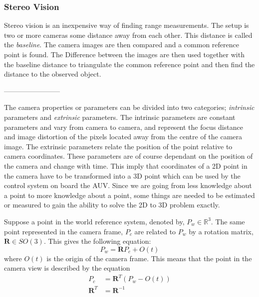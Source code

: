 \subsubsection{Stereo Vision}
Stereo vision is an inexpensive way of finding range measurements. The setup is two or
more cameras some distance away from each other. This distance is called the
\emph{baseline}. The camera images are then compared and a common reference point is
found. The Difference between the images are then used together with the baseline distance
to triangulate the common reference point and then find the distance to the observed
object. 


------------------------

	The camera properties or parameters can be divided into two categories; \textit{intrinsic} parameters and
	\textit{extrinsic} parameters. The intrinsic parameters are constant parameters and vary from camera to
	camera, and represent the focus distance and image distortion of the pixels located away from the centre of the
	camera image. 
	The extrinsic parameters relate the position of the point relative to camera coordinates. 
	These parameters are of course dependant on the position of the camera and change with time. 	This imply that 
	coordinates of a 2D point in the camera have to be transformed into a 3D point which can be used 
	by the control system on board the AUV. Since 
	we are going from less knowledge about a point to more knowledge about a point, some things are needed to be 
	estimated or measured to gain the ability to solve the 2D to 3D problem exactly.\cite{robotbok}

	Suppose a point in the world reference system, denoted by, $P_w \in \mathbb{R}^3$. The same point
	represented in the camera frame, $P_c$ are related to $P_w$ by a rotation matrix, $\mathbf{R} \in
	SO(3)$. This gives the following equation: 
	\begin{equation}
		P_w = \mathbf{R} P_c + O(t)
	\end{equation}
	where $O(t)$ is the origin of the camera frame. This means that the point in the camera view is
	described by the equation
	\begin{align}
		\label{eq:ch1-P_c}
		P_c &= \mathbf{R}^T (P_w - O(t)) \\
		\mathbf{R}^T &= \mathbf{R}^{-1} 
	\end{align}


